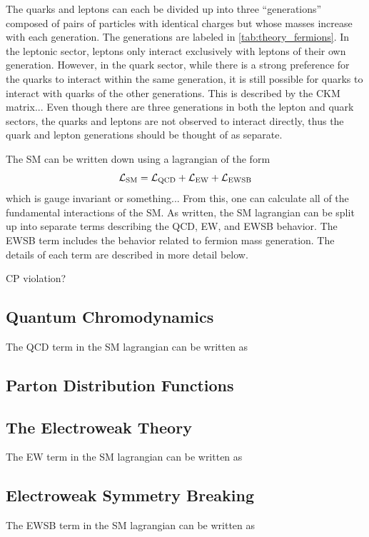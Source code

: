 The quarks and leptons can each be divided up into three ``generations'' composed of pairs
of particles with identical charges but whose masses increase with each generation.
The generations are labeled in \tab\ref{tab:theory_fermions}. 
In the leptonic sector, leptons only interact exclusively with leptons of their own generation.
However, in the quark sector, while there is a strong preference for the quarks to interact
within the same generation, it is still possible for quarks to interact with quarks of 
the other generations. This is described by the CKM matrix... %
Even though there are three 
generations in both the lepton and quark sectors, 
the quarks and leptons are not observed to interact directly, 
thus the quark and lepton generations should be thought of as separate.


The SM can be written down using a lagrangian of the form
\begin{equation}
\mathcal{L}_{\textrm{SM}} = \mathcal{L}_{\textrm{QCD}} + \mathcal{L}_{\textrm{EW}} + \mathcal{L}_{\textrm{EWSB}}
\end{equation}
which is gauge invariant or something...
From this, one can calculate all of the fundamental interactions of the SM.
As written, the SM lagrangian can be split up into separate terms describing the
QCD, EW, and EWSB behavior. 
The EWSB term includes the behavior related to fermion mass generation.
The details of each term are described in more detail below.

CP violation?

\subsection{Quantum Chromodynamics}
The QCD term in the SM lagrangian can be written as
\subsection{Parton Distribution Functions}
\subsection{The Electroweak Theory}
\label{sec:theory_ew}
The EW term in the SM lagrangian can be written as
\subsection{Electroweak Symmetry Breaking}
The EWSB term in the SM lagrangian can be written as



